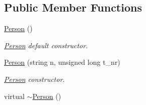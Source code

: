 \subsection*{Public Member Functions}
\begin{DoxyCompactItemize}
\item 
\hypertarget{class_person_a0397c6f89fafc12e738923f612bc41a3}{\hyperlink{class_person_a0397c6f89fafc12e738923f612bc41a3}{Person} ()}\label{class_person_a0397c6f89fafc12e738923f612bc41a3}

\begin{DoxyCompactList}\small\item\em \hyperlink{class_person}{Person} default constructor. \end{DoxyCompactList}\item 
\hyperlink{class_person_add253b6da1826be37fb9769eb2df2121}{Person} (string n, unsigned long t\+\_\+nr)
\begin{DoxyCompactList}\small\item\em \hyperlink{class_person}{Person} constructor. \end{DoxyCompactList}\item 
\hypertarget{class_person_a700ffd693321c5fe6880262acf43d4da}{virtual \hyperlink{class_person_a700ffd693321c5fe6880262acf43d4da}{$\sim$\+Person} ()}\label{class_person_a700ffd693321c5fe6880262acf43d4da}


\end{DoxyCompactItemize}
